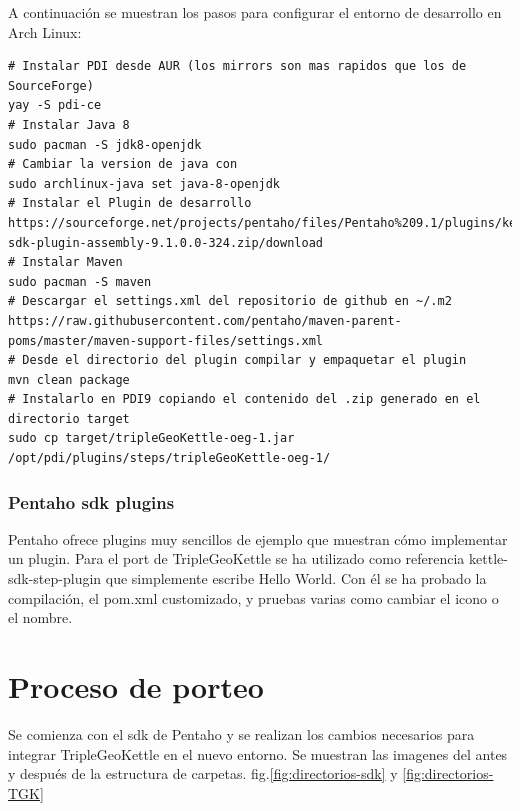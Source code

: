 A continuación se muestran los pasos para configurar el entorno de desarrollo en Arch Linux:

\begin{lstlisting}
# Instalar PDI desde AUR (los mirrors son mas rapidos que los de SourceForge)
yay -S pdi-ce
# Instalar Java 8
sudo pacman -S jdk8-openjdk
# Cambiar la version de java con
sudo archlinux-java set java-8-openjdk
# Instalar el Plugin de desarrollo
https://sourceforge.net/projects/pentaho/files/Pentaho%209.1/plugins/kettle-sdk-plugin-assembly-9.1.0.0-324.zip/download
# Instalar Maven
sudo pacman -S maven
# Descargar el settings.xml del repositorio de github en ~/.m2
https://raw.githubusercontent.com/pentaho/maven-parent-poms/master/maven-support-files/settings.xml
# Desde el directorio del plugin compilar y empaquetar el plugin
mvn clean package
# Instalarlo en PDI9 copiando el contenido del .zip generado en el directorio target
sudo cp target/tripleGeoKettle-oeg-1.jar /opt/pdi/plugins/steps/tripleGeoKettle-oeg-1/
\end{lstlisting}

\subsubsection{Pentaho sdk plugins}

Pentaho ofrece plugins\cite{pdi-sdk} muy sencillos de ejemplo que muestran cómo implementar un plugin. Para el port de
TripleGeoKettle se ha utilizado como referencia kettle-sdk-step-plugin que simplemente escribe Hello World. Con
él se ha probado la compilación, el pom.xml customizado, y pruebas varias como cambiar el icono o el nombre.


\section{Proceso de porteo}

Se comienza con el sdk de Pentaho y se realizan los cambios necesarios para integrar TripleGeoKettle en el nuevo
entorno. Se muestran las imagenes del antes y después de la estructura de carpetas. fig.\ref{fig:directorios-sdk}
y \ref{fig:directorios-TGK}

